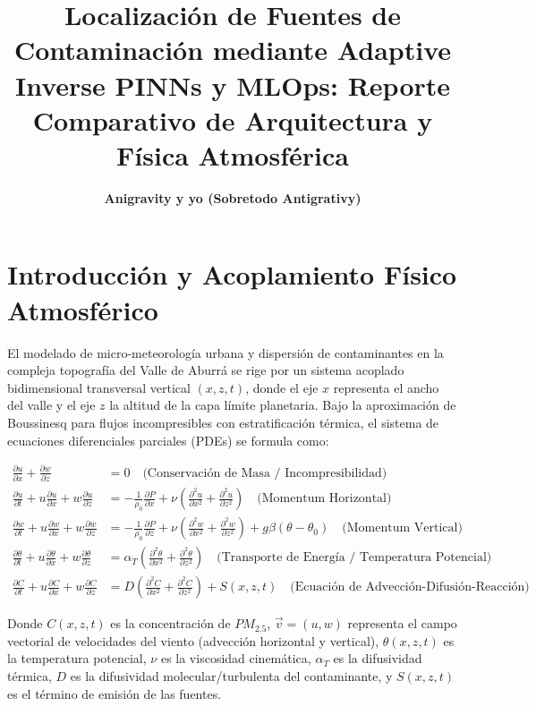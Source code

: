 \documentclass[11pt,a4paper]{article}
\title{\textbf{\color{primary}Localización de Fuentes de Contaminación mediante Adaptive Inverse PINNs y MLOps: Reporte Comparativo de Arquitectura y Física Atmosférica}}
\author{\textbf{Anigravity y yo (Sobretodo Antigrativy)}}
\date{}
\begin{document}
\maketitle

\section*{Introducción y Acoplamiento Físico Atmosférico}
El modelado de micro-meteorología urbana y dispersión de contaminantes en la compleja topografía del Valle de Aburrá se rige por un sistema acoplado bidimensional transversal vertical $(x, z, t)$, donde el eje $x$ representa el ancho del valle y el eje $z$ la altitud de la capa límite planetaria. Bajo la aproximación de Boussinesq para flujos incompresibles con estratificación térmica, el sistema de ecuaciones diferenciales parciales (PDEs) se formula como:

\begin{align}
\frac{\partial u}{\partial x} + \frac{\partial w}{\partial z} &= 0 \quad \text{(Conservación de Masa / Incompresibilidad)} \\
\frac{\partial u}{\partial t} + u\frac{\partial u}{\partial x} + w\frac{\partial u}{\partial z} &= -\frac{1}{\rho_0}\frac{\partial P}{\partial x} + \nu \left( \frac{\partial^2 u}{\partial x^2} + \frac{\partial^2 u}{\partial z^2} \right) \quad \text{(Momentum Horizontal)} \\
\frac{\partial w}{\partial t} + u\frac{\partial w}{\partial x} + w\frac{\partial w}{\partial z} &= -\frac{1}{\rho_0}\frac{\partial P}{\partial z} + \nu \left( \frac{\partial^2 w}{\partial x^2} + \frac{\partial^2 w}{\partial z^2} \right) + g\beta(\theta - \theta_0) \quad \text{(Momentum Vertical)} \\
\frac{\partial \theta}{\partial t} + u\frac{\partial \theta}{\partial x} + w\frac{\partial \theta}{\partial z} &= \alpha_T \left( \frac{\partial^2 \theta}{\partial x^2} + \frac{\partial^2 \theta}{\partial z^2} \right) \quad \text{(Transporte de Energía / Temperatura Potencial)} \\
\frac{\partial C}{\partial t} + u\frac{\partial C}{\partial x} + w\frac{\partial C}{\partial z} &= D \left( \frac{\partial^2 C}{\partial x^2} + \frac{\partial^2 C}{\partial z^2} \right) + S(x, z, t) \quad \text{(Ecuación de Advección-Difusión-Reacción)}
\end{align}

Donde $C(x,z,t)$ es la concentración de $PM_{2.5}$, $\vec{v} = (u, w)$ representa el campo vectorial de velocidades del viento (advección horizontal y vertical), $\theta(x,z,t)$ es la temperatura potencial, $\nu$ es la viscosidad cinemática, $\alpha_T$ es la difusividad térmica, $D$ es la difusividad molecular/turbulenta del contaminante, y $S(x, z, t)$ es el término de emisión de las fuentes.\\
\end{document}
